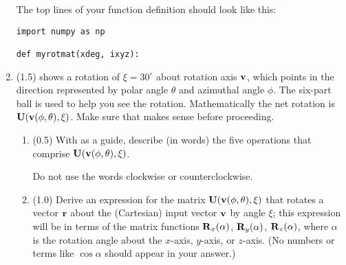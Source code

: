 \documentclass[11pt,titlepage,fleqn]{article}
\newcommand{\rotangA}{\alpha}
\newcommand{\rotangB}{\xi}    %
\newcommand{\rotvec}{\bv}      %
\begin{document}
\begin{enumerate}
The top lines of your function definition should look like this:
%
\begin{verbatim}
import numpy as np

def myrotmat(xdeg, ixyz):
\end{verbatim}

\item (1.5)  shows a rotation of $\rotangB = 30^\circ$ about rotation axis $\rotvec$, which points in the direction represented by polar angle $\theta$ and azimuthal angle $\phi$. The six-part ball is used to help you see the rotation. Mathematically the net rotation is $\bU(\rotvec(\phi,\theta),\rotangB)$. Make sure that  makes sense before proceeding.
%
\begin{enumerate}
\item (0.5) With  as a guide, describe (in words) the five operations that comprise $\bU(\rotvec(\phi,\theta),\rotangB)$.

Do not use the words clockwise or counterclockwise.

\item (1.0) Derive an expression for the matrix $\bU(\rotvec(\phi,\theta),\rotangB)$ that rotates a vector $\mbox{${\bf r}$}$ about the (Cartesian) input vector $\rotvec$ by angle $\rotangB$; this expression will be in terms of the matrix functions $\bR_x(\rotangA)$, $\bR_y(\rotangA)$, $\bR_z(\rotangA)$, where $\rotangA$ is the rotation angle about the $x$-axis, $y$-axis, or $z$-axis. (No numbers or terms like $\cos\rotangA$ should appear in your answer.)

\end{enumerate}


\end{enumerate}
\end{document}
